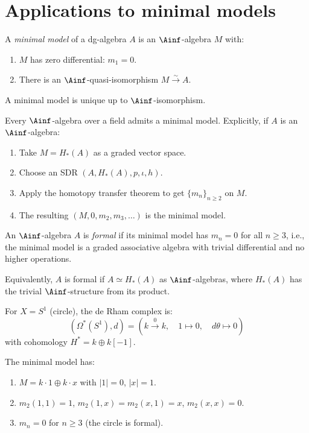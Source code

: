 \section{Applications to minimal models}
\label{sec:minimal-models}

\begin{definition}
\label{def:minimal-model}
A \emph{minimal model} of a dg-algebra $A$ is an $\Ainf$-algebra $M$ with:
\begin{enumerate}[label=(\roman*)]
\item $M$ has zero differential: $m_1 = 0$.
\item There is an $\Ainf$-quasi-isomorphism $M \xrightarrow{\sim} A$.
\end{enumerate}
A minimal model is unique up to $\Ainf$-isomorphism.
\end{definition}

\begin{theorem}
\label{thm:minimal-model-existence}
Every $\Ainf$-algebra over a field admits a minimal model. Explicitly, if
$A$ is an $\Ainf$-algebra:
\begin{enumerate}[label=(\roman*)]
\item Take $M = H_*(A)$ as a graded vector space.
\item Choose an SDR $(A, H_*(A), p, \iota, h)$.
\item Apply the homotopy transfer theorem to get $\{m_n\}_{n \geq 2}$ on $M$.
\item The resulting $(M, 0, m_2, m_3, \ldots)$ is the minimal model.
\end{enumerate}
\end{theorem}

\begin{corollary}
\label{cor:formality}
An $\Ainf$-algebra $A$ is \emph{formal} if its minimal model has $m_n = 0$
for all $n \geq 3$, i.e., the minimal model is a graded associative
algebra with trivial differential and no higher operations.

Equivalently, $A$ is formal if $A \simeq H_*(A)$ as $\Ainf$-algebras, where
$H_*(A)$ has the trivial $\Ainf$-structure from its product.
\end{corollary}

\begin{example}
\label{ex:minimal-derham}
For $X = S^1$ (circle), the de Rham complex is:
\[
(\Omega^*(S^1), d) = (k \xrightarrow{0} k, \quad 1 \mapsto 0, \quad d\theta \mapsto 0)
\]
with cohomology $H^* = k \oplus k[-1]$.

The minimal model has:
\begin{enumerate}[label=(\roman*)]
\item $M = k \cdot 1 \oplus k \cdot x$ with $|1| = 0$, $|x| = 1$.
\item $m_2(1, 1) = 1$, $m_2(1, x) = m_2(x, 1) = x$, $m_2(x, x) = 0$.
\item $m_n = 0$ for $n \geq 3$ (the circle is formal).
\end{enumerate}
\end{example}


